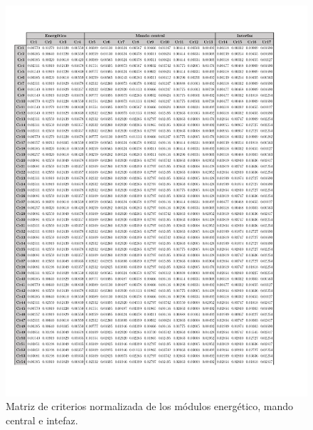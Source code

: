\newpage
\begin{figure}[H]
	\centering
	\includegraphics[width=16cm]{imagenes/MNormalizada1Ex}
	\caption{Matriz de criterios normalizada de los módulos energético, mando central e intefaz.}
	\label{fig:MNormalizada1Ex}
\end{figure}

